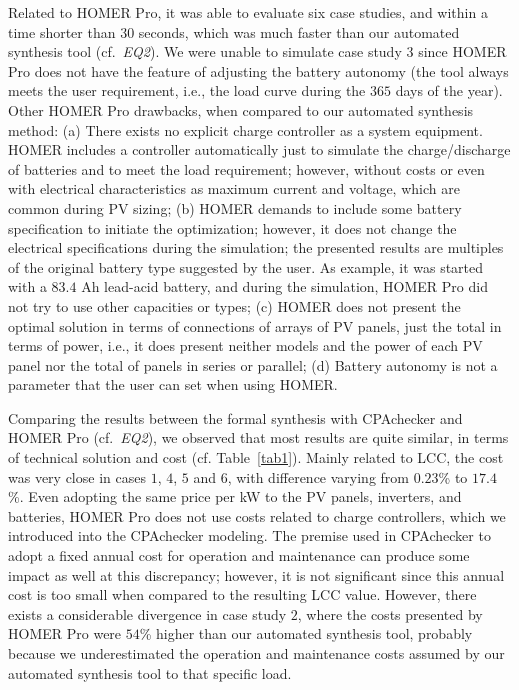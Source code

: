 \documentclass[journal]{IEEEtran}
\begin{document}
Related to HOMER Pro, it was able to evaluate six case studies, and within a time shorter than $30$ seconds, which was much faster than our automated synthesis tool (cf.~\textit{EQ2}). We were unable to simulate case study $3$ since HOMER Pro does not have the feature of adjusting the battery autonomy (the tool always meets the user requirement, i.e., the load curve during the $365$ days of the year). Other HOMER Pro drawbacks, when compared to our automated synthesis method: (a) There exists no explicit charge controller as a system equipment. HOMER includes a controller automatically just to simulate the charge/discharge of batteries and to meet the load requirement; however, without costs or even with electrical characteristics as maximum current and voltage, which are common during PV sizing; (b) HOMER demands to include some battery specification to initiate the optimization; however, it does not change the electrical specifications during the simulation; the presented results are multiples of the original battery type suggested by the user. As example, it was started with a $83.4$ Ah lead-acid battery, and during the simulation, HOMER Pro did not try to use other capacities or types; (c) HOMER does not present the optimal solution in terms of connections of arrays of PV panels, just the total in terms of power, i.e., it does present neither models and the power of each PV panel nor the total of panels in series or parallel; (d) Battery autonomy is not a parameter that the user can set when using HOMER. 

Comparing the results between the formal synthesis with CPAchecker and HOMER Pro (cf.~\textit{EQ2}), 
we observed that most results are quite similar, in terms of technical solution and cost (cf. Table~\ref{tab1}). 
Mainly related to LCC, the cost was very close in cases $1$, $4$, $5$ and $6$, with difference varying from $0.23$\% to $17.4$\%. 
Even adopting the same price per kW to the PV panels, 
inverters, and batteries, HOMER Pro does not use costs 
related to charge controllers, which we introduced into the 
CPAchecker modeling. The premise used in CPAchecker to adopt 
a fixed annual cost for operation and maintenance can produce 
some impact as well at this discrepancy; however, it is not significant
since this annual cost is too small when compared to the resulting LCC value.
However, there exists a considerable divergence in case study $2$, where the costs presented by HOMER Pro were $54$\% higher than our automated synthesis tool, probably because we underestimated the operation and maintenance costs assumed by our automated synthesis tool to that specific load. 
\end{document}

